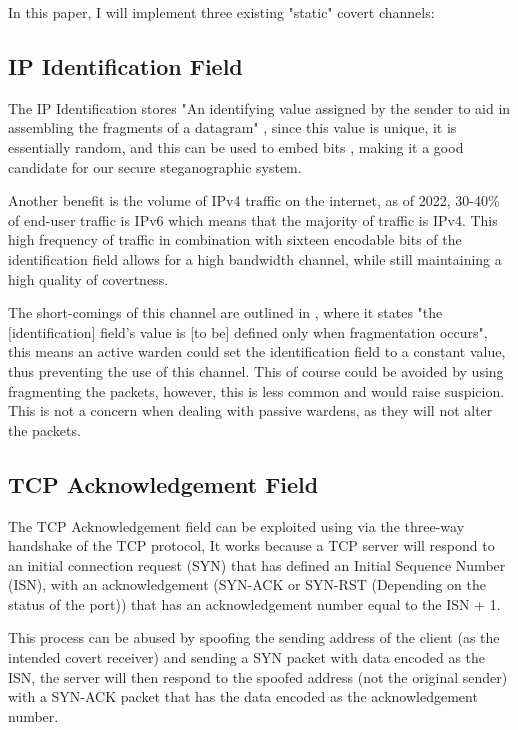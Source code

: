 In this paper, I will implement three existing "static" covert channels:

\subsection{IP Identification Field}

The IP Identification stores "An identifying value assigned by the sender to aid in assembling the fragments of a datagram" \cite{rfc791}, since this value is unique, it is essentially random, and this can be used to embed bits \cite{EoIICCA}, making it a good candidate for our secure steganographic system.

Another benefit is the volume of IPv4 traffic on the internet, as of 2022, 30-40\% of end-user traffic is IPv6 \cite{I10YO} which means that the majority of traffic is IPv4. This high frequency of traffic in combination with sixteen encodable bits of the identification field allows for a high bandwidth channel, while still maintaining a high quality of covertness.

The short-comings of this channel are outlined in \cite{rfc6864}, where it states "the [identification] field's value is [to be] defined only when fragmentation occurs", this means an active warden could set the identification field to a constant value, thus preventing the use of this channel. This of course could be avoided by using fragmenting the packets, however, this is less common and would raise suspicion. This is not a concern when dealing with passive wardens, as they will not alter the packets.

\subsection{TCP Acknowledgement Field}

The TCP Acknowledgement field can be exploited using via the three-way handshake of the TCP protocol, It works because a TCP server will respond to an initial connection request (SYN) that has defined an Initial Sequence Number (ISN), with an acknowledgement (SYN-ACK or SYN-RST (Depending on the status of the port)) that has an acknowledgement number equal to the ISN + 1.

This process can be abused by spoofing the sending address of the client (as the intended covert receiver) and sending a SYN packet with data encoded as the ISN, the server will then respond to the spoofed address (not the original sender) with a SYN-ACK packet that has the data encoded as the acknowledgement number. \cite{CCitTCPIPPS}

